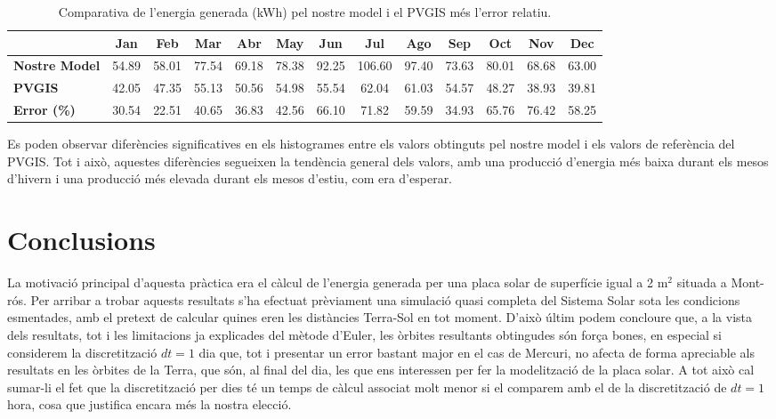 \documentclass[10pt, twoside, a4paper]{article}
\begin{document}
\begin{table}[h!]
    \centering
    \renewcommand{\arraystretch}{1.5}  %
    \caption{Comparativa de l'energia generada (kWh) pel nostre model i el PVGIS més l'error relatiu.}
    \begin{tabular}{l*{12}{c}} 
        \hline
        \textbf{ } & \textbf{Jan} & \textbf{Feb} & \textbf{Mar} & \textbf{Abr} & \textbf{May} & \textbf{Jun} & \textbf{Jul} & \textbf{Ago} & \textbf{Sep} & \textbf{Oct} & \textbf{Nov} & \textbf{Dec} \\
        \hline
        \textbf{Nostre Model} & 54.89 & 58.01 & 77.54 & 69.18 & 78.38 & 92.25 & 106.60 & 97.40 & 73.63 & 80.01 & 68.68 & 63.00 \\
        \textbf{PVGIS} & 42.05 & 47.35 & 55.13 & 50.56 & 54.98 & 55.54 & 62.04 & 61.03 & 54.57 & 48.27 & 38.93 & 39.81 \\
        \textbf{Error (\%)} & 30.54 & 22.51 & 40.65 & 36.83 & 42.56 & 66.10 & 71.82 & 59.59 & 34.93 & 65.76 & 76.42 & 58.25 \\
        \hline
    \end{tabular}
\end{table}


Es poden observar diferències significatives en els histogrames entre els valors obtinguts pel nostre model i els valors de referència del PVGIS. Tot i això, aquestes diferències segueixen la tendència general dels valors, amb una producció d'energia més baixa durant els mesos d'hivern i una producció més elevada durant els mesos d'estiu, com era d'esperar.

\section{Conclusions}

La motivació principal d'aquesta pràctica era el càlcul de l'energia generada per una placa solar de superfície igual a 2 m$^2$ situada a Mont-rós. Per arribar a trobar aquests resultats s'ha efectuat prèviament una simulació quasi completa del Sistema Solar sota les condicions esmentades, amb el pretext de calcular quines eren les distàncies Terra-Sol en tot moment. D'això últim podem concloure que, a la vista dels resultats, tot i les limitacions ja explicades del mètode d'Euler, les òrbites resultants obtingudes són força bones, en especial si considerem la discretització $dt=1$ dia que, tot i presentar un error bastant major en el cas de Mercuri, no afecta de forma apreciable als resultats en les òrbites de la Terra, que són, al final del dia, les que ens interessen per fer la modelització de la placa solar. A tot això cal sumar-li el fet que la discretització per dies té un temps de càlcul associat molt menor si el comparem amb el de la discretització de $dt=1$ hora, cosa que justifica encara més la nostra elecció.
\end{document}
